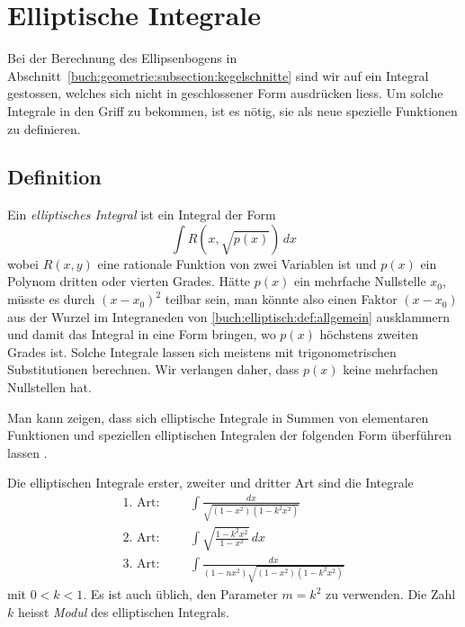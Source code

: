 %
%
%
\section{Elliptische Integrale
\label{buch:elliptisch:section:integral}}
Bei der Berechnung des Ellipsenbogens in 
Abschnitt~\ref{buch:geometrie:subsection:kegelschnitte}
sind wir auf ein Integral gestossen, welches sich nicht in geschlossener
Form ausdrücken liess.
Um solche Integrale in den Griff zu bekommen, ist es nötig, sie als
neue spezielle Funktionen zu definieren.

\subsection{Definition
\label{buch:elliptisch:subsection:definition}}
Ein {\em elliptisches Integral} ist ein Integral der Form
%
%
\begin{equation}
\int R\left( x, \sqrt{p(x)}\right)\,dx
\label{buch:elliptisch:def:allgemein}
\end{equation}
wobei $R(x,y)$ eine rationale Funktion von zwei Variablen ist und
$p(x)$ ein Polynom dritten oder vierten Grades.
Hätte $p(x)$ ein mehrfache Nullstelle $x_0$, müsste es durch $(x-x_0)^2$
teilbar sein, man könnte also einen Faktor $(x-x_0)$ aus der
Wurzel im Integraneden von \eqref{buch:elliptisch:def:allgemein}
ausklammern und damit das Integral in eine Form bringen, wo $p(x)$
höchstens zweiten Grades ist.
Solche Integrale lassen sich meistens mit trigonometrischen Substitutionen
berechnen.
Wir verlangen daher, dass $p(x)$ keine mehrfachen Nullstellen hat.

Man kann zeigen, dass sich elliptische Integrale in Summen von
elementaren Funktionen und speziellen elliptischen Integralen 
der folgenden Form überführen lassen
\cite[Abschnitt 164, p.~506]{buch:smirnov32}.

\begin{definition}
\label{buch:elliptisch:def:integrale123}
Die elliptischen Integrale erster, zweiter und dritter Art sind die
Integrale
\[
\begin{aligned}
\text{1.~Art:}&&&
\int \frac{dx}{\sqrt{(1-x^2)(1-k^2x^2)}}
\\
\text{2.~Art:}&&&
\int \sqrt{\frac{1-k^2x^2}{1-x^2}}\,dx
\\
\text{3.~Art:}&&&
\int \frac{dx}{(1-nx^2)\sqrt{(1-x^2)(1-k^2x^2)}}
\end{aligned}
\]
mit $0<k<1$.
Es ist auch üblich, den Parameter $m=k^2$ zu verwenden.
Die Zahl $k$ heisst {\em Modul} des elliptischen Integrals.
%
%
\end{definition}

